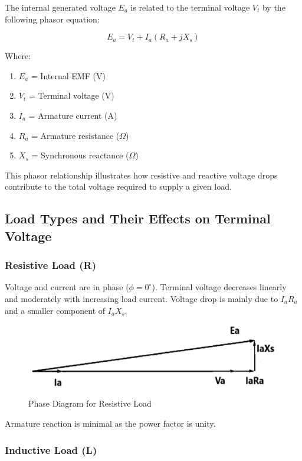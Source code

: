 \documentclass[a4paper,12pt]{article}
\begin{document}
The internal generated voltage \( E_a \) is related to the terminal voltage \( V_t \) by the following phasor equation:

\[
E_a = V_t + I_a(R_a + jX_s)
\]

Where:
\begin{enumerate}
	\item \( E_a \) = Internal EMF (V)
	\item \( V_t \) = Terminal voltage (V)
	\item \( I_a \) = Armature current (A)
	\item \( R_a \) = Armature resistance ($\Omega$)
	\item \( X_s \) = Synchronous reactance ($\Omega$)
\end{enumerate}

This phasor relationship illustrates how resistive and reactive voltage drops contribute to the total voltage required to supply a given load.

\subsection{Load Types and Their Effects on Terminal Voltage}

\subsubsection*{Resistive Load (R)}

	 Voltage and current are in phase (\( \phi = 0^\circ \)).
	 Terminal voltage decreases linearly and moderately with increasing load current.
	 Voltage drop is mainly due to \( I_aR_a \) and a smaller component of \( I_aX_s \).
\begin{figure}[H]
	\centering
	\includegraphics[width=0.7\linewidth]{Images/2}
	\caption{ Phase Diagram for Resistive Load}
	\label{fig:2}
\end{figure}
	 Armature reaction is minimal as the power factor is unity.


\subsubsection*{Inductive Load (L)}
\end{document}
